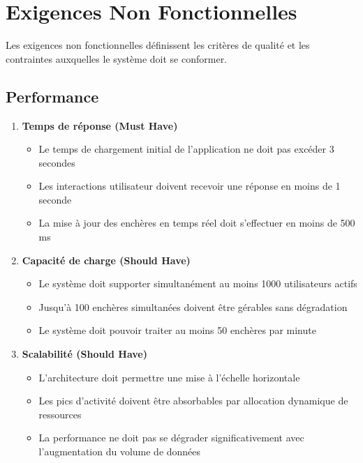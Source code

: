 \section{Exigences Non Fonctionnelles}

Les exigences non fonctionnelles définissent les critères de qualité et les contraintes auxquelles le système doit se conformer.

\subsection{Performance}

\begin{enumerate}
    \item \textbf{Temps de réponse (Must Have)}
    \begin{itemize}
        \item Le temps de chargement initial de l'application ne doit pas excéder 3 secondes
        \item Les interactions utilisateur doivent recevoir une réponse en moins de 1 seconde
        \item La mise à jour des enchères en temps réel doit s'effectuer en moins de 500 ms
    \end{itemize}
    
    \item \textbf{Capacité de charge (Should Have)}
    \begin{itemize}
        \item Le système doit supporter simultanément au moins 1000 utilisateurs actifs
        \item Jusqu'à 100 enchères simultanées doivent être gérables sans dégradation
        \item Le système doit pouvoir traiter au moins 50 enchères par minute
    \end{itemize}
    
    \item \textbf{Scalabilité (Should Have)}
    \begin{itemize}
        \item L'architecture doit permettre une mise à l'échelle horizontale
        \item Les pics d'activité doivent être absorbables par allocation dynamique de ressources
        \item La performance ne doit pas se dégrader significativement avec l'augmentation du volume de données
    \end{itemize}
\end{enumerate}

